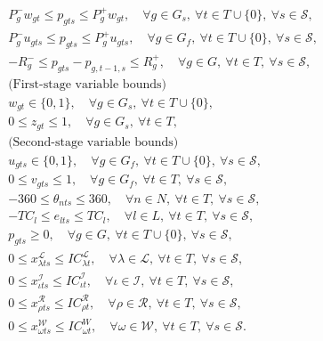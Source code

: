 \begin{subequations}
\begin{align}
	&P_g^- w_{gt} \le p_{gts} \le P_g^+ w_{gt},\quad\forall g\in G_s,\ \forall t\in T\cup\{0\},\ \forall s\in\mathcal{S},\label{SUC:j}\\
	&P_g^- u_{gts} \le p_{gts} \le P_g^+ u_{gts},\quad\forall g\in G_f,\ \forall t\in T\cup\{0\},\ \forall s\in\mathcal{S},\label{SUC:k}\\
	&-R_g^- \le p_{gts}-p_{g,t-1,s} \le R_g^+ ,\quad\forall g\in G,\ \forall t\in T,\ \forall s\in\mathcal{S},\label{SUC:l}\\
	&  \textrm{(First-stage variable bounds)} \nonumber\\
	&w_{gt}\in\{0,1\},\quad\forall g\in G_s,\ \forall t\in T\cup\{0\},\label{SUC:m}\\
	& 0\le z_{gt}\le 1,\quad\forall g\in G_s,\ \forall t\in T,\label{SUC:n}\\
	&  \textrm{(Second-stage variable bounds)} \nonumber\\
	&u_{gts}\in\{0,1\},\quad\forall g\in G_f,\ \forall t\in T\cup\{0\},\ \forall s\in\mathcal{S},\label{SUC:o}\\
	&0\le v_{gts}\le 1,\quad\forall g\in G_f,\ \forall t\in T,\ \forall s\in\mathcal{S},\label{SUC:p}\\
	&-360\le\theta_{nts}\le 360,\quad\forall n\in N,\ \forall t\in T,\ \forall s\in\mathcal{S},\label{SUC:q}\\
	&-TC_l\le e_{lts}\le TC_l,\quad\forall l\in L,\ \forall t\in T,\ \forall s\in\mathcal{S},\label{SUC:r}\\
	&p_{gts}\ge 0,\quad\forall g\in G,\ \forall t\in T\cup\{0\},\ \forall s\in\mathcal{S},\label{SUC:s}\\
	&0\le x_{\lambda ts}^\mathcal{L}\le IC_{\lambda t}^\mathcal{L},\quad\forall \lambda\in \mathcal{L},\ \forall t\in T,\ \forall s\in\mathcal{S},\label{SUC:t}\\
	&0\le x_{\iota ts}^\mathcal{I}\le IC_{\iota t}^\mathcal{I},\quad\forall \iota \in \mathcal{I},\ \forall t\in T,\ \forall s\in\mathcal{S},\label{SUC:u}\\
	&0\le x_{\rho ts}^\mathcal{R} \le IC_{\rho t}^\mathcal{R},\quad\forall \rho\in\mathcal{R},\ \forall t\in T,\ \forall s\in\mathcal{S},\label{SUC:v}\\
	&0\le x_{\omega ts}^\mathcal{W}\le IC_{\omega t}^W,\quad\forall \omega\in\mathcal{W},\ \forall t\in T,\ \forall s\in\mathcal{S}.\label{SUC:w}
	\end{align}	
\end{subequations}

